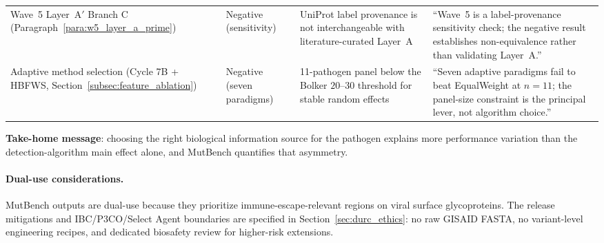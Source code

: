 \begin{table}[htbp]
\begin{tabular}{p{}p{}p{}p{}}
Wave~5 Layer~A$'$ Branch C (Paragraph~\ref{para:w5_layer_a_prime}) & Negative (sensitivity) & UniProt label provenance is not interchangeable with literature-curated Layer~A & ``Wave~5 is a label-provenance sensitivity check; the negative result establishes non-equivalence rather than validating Layer~A.'' \\
Adaptive method selection (Cycle 7B + HBFWS, Section~\ref{subsec:feature_ablation}) & Negative (seven paradigms) & 11-pathogen panel below the Bolker $20$--$30$ threshold for stable random effects & ``Seven adaptive paradigms fail to beat EqualWeight at $n=11$; the panel-size constraint is the principal lever, not algorithm choice.'' \\
\bottomrule
\end{tabular}
\end{table}

\textbf{Take-home message}: choosing the right biological information source for the pathogen explains more performance variation than the detection-algorithm main effect alone, and MutBench quantifies that asymmetry.

\paragraph{Dual-use considerations.} MutBench outputs are dual-use because they prioritize immune-escape-relevant regions on viral surface glycoproteins. The release mitigations and IBC/P3CO/Select Agent boundaries are specified in Section~\ref{sec:durc_ethics}: no raw GISAID FASTA, no variant-level engineering recipes, and dedicated biosafety review for higher-risk extensions.

